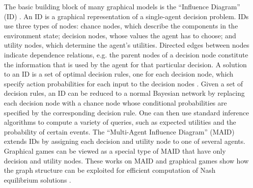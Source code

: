 \documentclass[final,1p,times,authoryear]{elsarticle}
\begin{document}
The basic building block of many graphical models is the ``Influence Diagram'' (ID) \citep{hm2005,hm1984}. An ID is a graphical representation of a single-agent decision problem. IDs use three types of nodes: chance nodes, which describe the components in the environment state; decision nodes, whose values the agent has to choose; and utility nodes, which determine the agent's utilities. Directed edges between nodes indicate dependence relations, e.g. the parent nodes of a decision node constitute the information that is used by the agent for that particular decision. A solution to an ID is a set of optimal decision rules, one for each decision node, which specify action probabilities for each input to the decision nodes \citep{s1986}. Given a set of decision rules, an ID can be reduced to a normal Bayesian network by replacing each decision node with a chance node whose conditional probabilities are specified by the corresponding decision rule. One can then use standard inference algorithms \citep{p1988} to compute a variety of queries, such as expected utilities and the probability of certain events. The ``Multi-Agent Influence Diagram'' (MAID) \citep{kb2003} extends IDs by assigning each decision and utility node to one of several agents. Graphical games \citep{vk2002,kls2001,l2000} can be viewed as a special type of MAID that have only decision and utility nodes. These works on MAID and graphical games show how the graph structure can be exploited for efficient computation of Nash equilibrium solutions \citep{n1950}.
\end{document}
